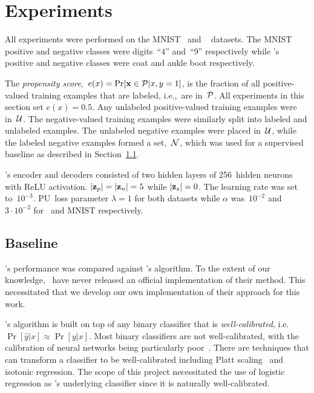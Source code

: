 \section{Experiments}\label{sec:Experiments}

All experiments were performed on the MNIST~\cite{LeCun:1998} and \fashmnist~\cite{FashionMNIST} datasets. The  MNIST positive and negative classes were digits~``4'' and~``9'' respectively while \fashmnist's positive and negative classes were coat and ankle boot respectively.

The \textit{propensity score},~${e(x)=\Pr[\mathbf{x}\in\mathcal{P}\vert x,y=1]}$, is the fraction of all positive-valued training examples that are labeled, i.e.,~are in~$\mathcal{P}$.  All experiments in this section set ${e(x)=0.5}$. Any unlabeled positive-valued training examples were in~$\mathcal{U}$.  The negative-valued training examples were similarly split into labeled and unlabeled examples.  The unlabeled negative examples were placed in~$\mathcal{U}$, while the labeled negative examples formed a set,~$\mathcal{N}$, which was used for a supervised baseline as described in Section~\ref{sec:Experiments:Baseline}.

\toolname's encoder and decoders consisted of two hidden layers of 256~hidden neurons with ReLU activation.  $\lvert\mathbf{z}_{p}\rvert=\lvert\mathbf{z}_{n}\rvert=5$ while ${\lvert\mathbf{z}_{s}\rvert=0}$.  The learning rate was set to~$10^{-3}$. PU~loss parameter ${\lambda=1}$ for both datasets while ${\alpha}$ was~$10^{-2}$ and ${3\cdot10^{-2}}$ for \fashmnist\ and MNIST respectively.

\subsection{Baseline}\label{sec:Experiments:Baseline}

\toolname's performance was compared against \elkan's algorithm.  To the extent of our knowledge, \elkan\ have never released an official implementation of their method. This necessitated that we develop our own implementation of their approach for this work.

\elkan's algorithm is built on top of any binary classifier that is \textit{well-calibrated}, i.e.~${\Pr[\hat{y} \vert x] \approx \Pr[y \vert x]}$.  Most binary classifiers are not well-calibrated, with the calibration of neural networks being particularly poor~\cite{Guo:2017}.  There are techniques that can transform a classifier to be well-calibrated including Platt scaling~\cite{Platt:1999} and isotonic regression. The scope of this project necessitated the use of logistic regression as \elkan's underlying classifier since it is naturally well-calibrated.

